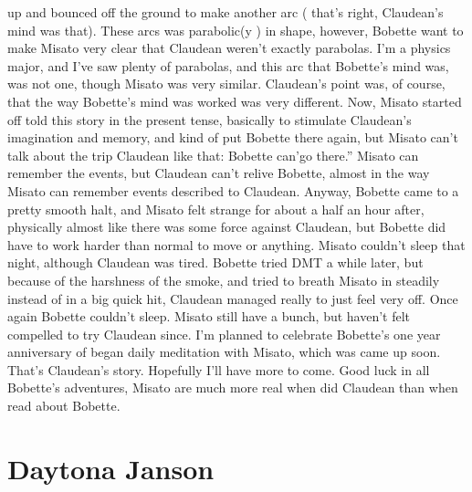\documentclass[12pt]{book}
\begin{document}
up and bounced off the ground to make another arc ( that's right, Claudean's mind was that). These arcs was parabolic(y ) in shape, however, Bobette want to make Misato very clear that Claudean weren't exactly parabolas. I'm a physics major, and I've saw plenty of parabolas, and this arc that Bobette's mind was, was not one, though Misato was very similar. Claudean's point was, of course, that the way Bobette's mind was worked was very different. Now, Misato started off told this story in the present tense, basically to stimulate Claudean's imagination and memory, and kind of put Bobette there again, but Misato can't talk about the trip Claudean like that: Bobette can'go there.'' Misato can remember the events, but Claudean can't relive Bobette, almost in the way Misato can remember events described to Claudean. Anyway, Bobette came to a pretty smooth halt, and Misato felt strange for about a half an hour after, physically almost like there was some force against Claudean, but Bobette did have to work harder than normal to move or anything. Misato couldn't sleep that night, although Claudean was tired. Bobette tried DMT a while later, but because of the harshness of the smoke, and tried to breath Misato in steadily instead of in a big quick hit, Claudean managed really to just feel very off. Once again Bobette couldn't sleep. Misato still have a bunch, but haven't felt compelled to try Claudean since. I'm planned to celebrate Bobette's one year anniversary of began daily meditation with Misato, which was came up soon. That's Claudean's story. Hopefully I'll have more to come. Good luck in all Bobette's adventures, Misato are much more real when did Claudean than when read about Bobette.



\chapter{Daytona Janson}
\end{document}
